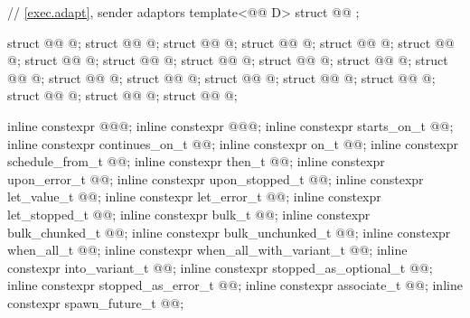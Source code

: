 \begin{codeblock}
{  // \ref{exec.adapt}, sender adaptors
  template<@@ D>
    struct @@ { };

  struct @@ { @\unspec@ };
  struct @@ { @\unspec@ };
  struct @@ { @\unspec@ };
  struct @@ { @\unspec@ };
  struct @@ { @\unspec@ };
  struct @@ { @\unspec@ };
  struct @@ { @\unspec@ };
  struct @@ { @\unspec@ };
  struct @@ { @\unspec@ };
  struct @@ { @\unspec@ };
  struct @@ { @\unspec@ };
  struct @@ { @\unspec@ };
  struct @@ { @\unspec@ };
  struct @@ { @\unspec@ };
  struct @@ { @\unspec@ };
  struct @@ { @\unspec@ };
  struct @@ { @\unspec@ };
  struct @@ { @\unspec@ };
  struct @@ { @\unspec@ };
  struct @@ { @\unspec@ };

  inline constexpr @\unspec@ @@{};
  inline constexpr @\unspec@ @@{};
  inline constexpr starts_on_t @@{};
  inline constexpr continues_on_t @@{};
  inline constexpr on_t @@{};
  inline constexpr schedule_from_t @@{};
  inline constexpr then_t @@{};
  inline constexpr upon_error_t @@{};
  inline constexpr upon_stopped_t @@{};
  inline constexpr let_value_t @@{};
  inline constexpr let_error_t @@{};
  inline constexpr let_stopped_t @@{};
  inline constexpr bulk_t @@{};
  inline constexpr bulk_chunked_t @@{};
  inline constexpr bulk_unchunked_t @@{};
  inline constexpr when_all_t @@{};
  inline constexpr when_all_with_variant_t @@{};
  inline constexpr into_variant_t @@{};
  inline constexpr stopped_as_optional_t @@{};
  inline constexpr stopped_as_error_t @@{};
  inline constexpr associate_t @@{};
  inline constexpr spawn_future_t @@{};
}


\end{codeblock}
